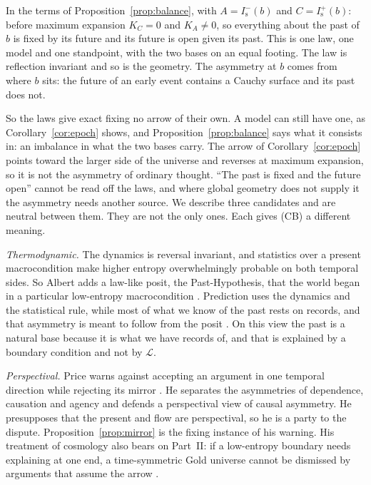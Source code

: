 \documentclass[11pt]{article}
\theoremstyle{definition}
\newcommand{\Is}{I^-_{\mathrm s}}
\newcommand{\Isp}{I^+_{\mathrm s}}
\begin{document}
In the terms of Proposition~\ref{prop:balance}, with $A=\Is(b)$ and $C=\Isp(b)$: before maximum expansion $K_C=0$ and $K_A\neq0$, so everything about the past of $b$ is fixed by its future and its future is open given its past. This is one law, one model and one standpoint, with the two bases on an equal footing. The law is reflection invariant and so is the geometry. The asymmetry at $b$ comes from where $b$ sits: the future of an early event contains a Cauchy surface and its past does not.

So the laws give exact fixing no arrow of their own. A model can still have one, as Corollary~\ref{cor:epoch} shows, and Proposition~\ref{prop:balance} says what it consists in: an imbalance in what the two bases carry. The arrow of Corollary~\ref{cor:epoch} points toward the larger side of the universe and reverses at maximum expansion, so it is not the asymmetry of ordinary thought. ``The past is fixed and the future open'' cannot be read off the laws, and where global geometry does not supply it the asymmetry needs another source. We describe three candidates and are neutral between them. They are not the only ones. Each gives (CB) a different meaning.

\emph{Thermodynamic.} The dynamics is reversal invariant, and statistics over a present macrocondition make higher entropy overwhelmingly probable on both temporal sides. So Albert adds a law-like posit, the Past-Hypothesis, that the world began in a particular low-entropy macrocondition \citep[p.~96]{Albert2000}. Prediction uses the dynamics and the statistical rule, while most of what we know of the past rests on records, and that asymmetry is meant to follow from the posit \citep[pp.~113--116]{Albert2000}. On this view the past is a natural base because it is what we have records of, and that is explained by a boundary condition and not by $\mathcal L$.

\emph{Perspectival.} Price warns against accepting an argument in one temporal direction while rejecting its mirror \citep[chs.~1--4]{Price1996}. He separates the asymmetries of dependence, causation and agency \citep[pp.~132--133]{Price1996} and defends a perspectival view of causal asymmetry. He presupposes that the present and flow are perspectival, so he is a party to the dispute. Proposition~\ref{prop:mirror} is the fixing instance of his warning. His treatment of cosmology also bears on Part~II: if a low-entropy boundary needs explaining at one end, a time-symmetric Gold universe cannot be dismissed by arguments that assume the arrow \citep[p.~81ff]{Price1996}.
\end{document}
